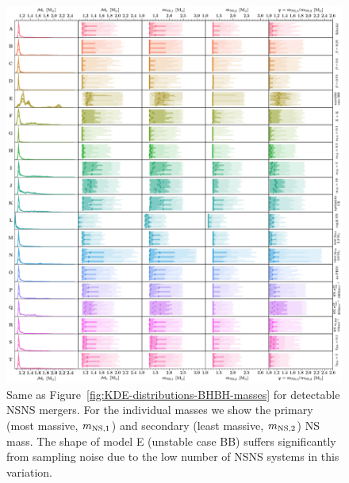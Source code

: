 \documentclass[fleqn,usenatbib]{mnras}
\begin{document}
%
\begin{figure}
    \centering
\includegraphics[width=1\textwidth]{figures/KDEplot_massesdet_BNS.png} %
\caption{Same as Figure~\ref{fig:KDE-distributions-BHBH-masses} for detectable \ac{NSNS} mergers. 
For the individual masses we show the primary (most massive, $m_{\rm{NS,1}}$) and secondary (least massive,  $m_{\rm{NS,2}}$) NS mass. 
The shape of model E (unstable case BB) suffers significantly from sampling noise due to the low number of NSNS systems in this variation. 
\href{https://github.com/FloorBroekgaarden/Double-Compact-Object-Mergers/blob/main/plottingCode/Fig_4_and_Fig_5_and_Fig_6/KDEplot_massesdet_BNS.png}{\faFileImage} \href{https://github.com/FloorBroekgaarden/Double-Compact-Object-Mergers/blob/main/plottingCode/Fig_4_and_Fig_5_and_Fig_6/make_figure_4_5_and_6-Only_Masses.ipynb}{\faBook} }
    \label{fig:KDE-distributions-NSNS-masses}
\end{figure}
%
\end{document}
